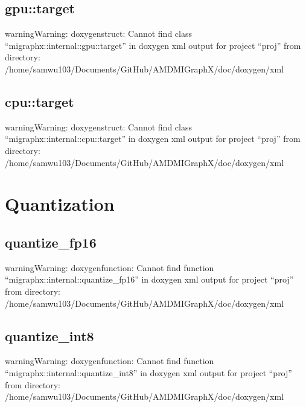 \documentclass[letterpaper,10pt,english]{sphinxmanual}
\begin{document}
\subsection{gpu::target}
\label{\detokenize{dev/targets:gpu-target}}
\begin{sphinxadmonition}{warning}{Warning:}
\sphinxAtStartPar
doxygenstruct: Cannot find class “migraphx::internal::gpu::target” in doxygen xml output for project “proj” from directory: /home/samwu103/Documents/GitHub/AMDMIGraphX/doc/doxygen/xml
\end{sphinxadmonition}


\subsection{cpu::target}
\label{\detokenize{dev/targets:cpu-target}}
\begin{sphinxadmonition}{warning}{Warning:}
\sphinxAtStartPar
doxygenstruct: Cannot find class “migraphx::internal::cpu::target” in doxygen xml output for project “proj” from directory: /home/samwu103/Documents/GitHub/AMDMIGraphX/doc/doxygen/xml
\end{sphinxadmonition}


\section{Quantization}
\label{\detokenize{dev/quantization:quantization}}\label{\detokenize{dev/quantization::doc}}

\subsection{quantize\_fp16}
\label{\detokenize{dev/quantization:quantize-fp16}}
\begin{sphinxadmonition}{warning}{Warning:}
\sphinxAtStartPar
doxygenfunction: Cannot find function “migraphx::internal::quantize\_fp16” in doxygen xml output for project “proj” from directory: /home/samwu103/Documents/GitHub/AMDMIGraphX/doc/doxygen/xml
\end{sphinxadmonition}


\subsection{quantize\_int8}
\label{\detokenize{dev/quantization:quantize-int8}}
\begin{sphinxadmonition}{warning}{Warning:}
\sphinxAtStartPar
doxygenfunction: Cannot find function “migraphx::internal::quantize\_int8” in doxygen xml output for project “proj” from directory: /home/samwu103/Documents/GitHub/AMDMIGraphX/doc/doxygen/xml
\end{sphinxadmonition}
\end{document}
